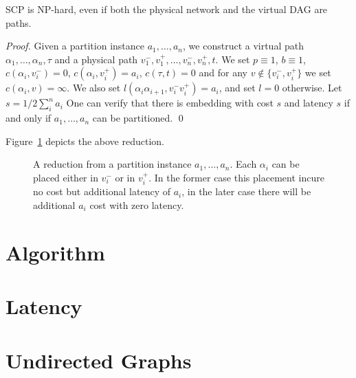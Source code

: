 \documentclass[runningheads]{llncs}
\newcommand{\scp}{\textsc{SCP}\xspace}
\begin{document}
\begin{theorem}
\scp is NP-hard, even if both the physical network and the virtual DAG
are paths.
\end{theorem}
\begin{proof}
 
Given a partition instance $a_1, \ldots, a_n$, we construct a virtual path
$\alpha_1, \ldots, \alpha_n, \tau$ and a physical path 
$v_1^-, v_1^+, \ldots, v_n^-, v_n^+, t$.
We set $p \equiv 1$, $b \equiv 1$, 
$c(\alpha_i, v_i^-) = 0$, $c(\alpha_i, v_i^+) = a_i$, $c(\tau, t) = 0$
and for any $v \notin \{v_i^-,v_i^+\}$ we set $c(\alpha_i, v) = \infty$.
We also set $l(\alpha_i\alpha_{i+1}, v_i^-v_i^+) = a_i$, and set $l = 0$
otherwise.
Let $s = 1/2\sum_i^n a_i$
One can verify that there is embedding with cost $s$ and latency $s$ 
if and only if $a_1, \ldots, a_n$ can be partitioned.
\qed
\end{proof}
Figure~\ref{fig:reduction2} depicts the above reduction.
\begin{figure}[ht]
\centering
\scalebox{.9}{

}
\caption[]{
\label{fig:reduction2}
A reduction from a partition instance $a_1, \ldots, a_n$.
Each $\alpha_i$ can be placed either in $v_i^-$ or in $v_i^+$.
In the former case this placement incure no cost but additional latency of $a_i$,
in the later case there will be additional $a_i$ cost with zero latency.
}
\end{figure}



\section{Algorithm}




\section{Latency}


\section{Undirected Graphs}




\end{document}
